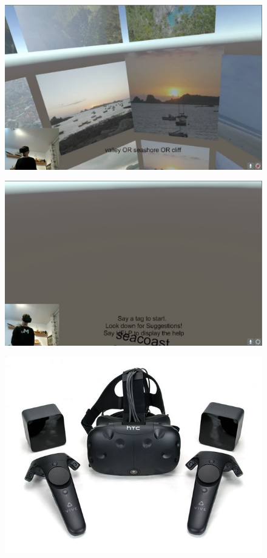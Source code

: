 \documentclass[11pt,a4paper]{article}
\begin{document}
\begin{figure}[h]
  \label{fig:3tag}
  \includegraphics[width=\textwidth]{img/TripleTag.jpg}
\end{figure}

\begin{figure}[h]
  \label{fig:suggestions}
  \includegraphics[width=\textwidth]{img/Start.jpg}
\end{figure}

\begin{figure}[h]
  \label{fig:vive}
  \includegraphics[width=\textwidth]{img/vive.jpg}
\end{figure}
\end{document}
